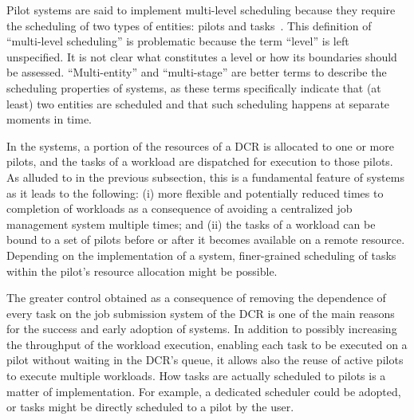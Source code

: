 \documentclass{sig-alternate}
\begin{document}
Pilot systems are said to implement multi-level scheduling because they require
the scheduling of two types of entities: pilots and
tasks~\cite{rubio2015gwpilot,de2014panda,balderrama2012scalable}. This
definition of ``multi-level scheduling'' is problematic because the term
``level'' is left unspecified. It is not clear what constitutes a level or how
its boundaries should be assessed. ``Multi-entity'' and ``multi-stage'' are
better terms to describe the scheduling properties of \pilot systems, as these
terms specifically indicate that (at least) two entities are scheduled and that
such scheduling happens at separate moments in time.

In the \pilot systems, a portion of the resources of a DCR is allocated to one
or more pilots, and the tasks of a workload are dispatched for execution to
those pilots. As alluded to in the previous subsection, this is a fundamental
feature of \pilot systems as it leads to the following: (i) more flexible and
potentially reduced times to completion of workloads as a consequence of
avoiding a centralized job management system multiple times; and (ii) the tasks
of a workload can be bound to a set of pilots before or after it becomes
available on a remote resource. Depending on the implementation of a \pilot
system, finer-grained scheduling of tasks within the pilot's resource allocation
might be possible.





The greater control obtained as a consequence of removing the dependence of
every task on the job submission system of the DCR is one of the main reasons
for the success and early adoption of \pilot systems. In addition to possibly
increasing the throughput of the workload execution, enabling each task to be
executed on a pilot without waiting in the DCR's queue, it allows also the reuse
of active pilots to execute multiple workloads. How tasks are actually scheduled
to pilots is a matter of implementation. For example, a dedicated scheduler
could be adopted, or tasks might be directly scheduled to a pilot by the user.
\end{document}
